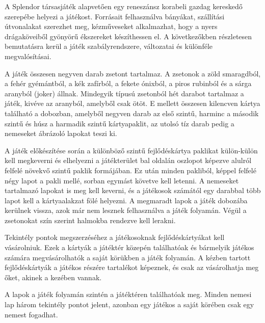 

A Splendor társasjáték alapvetően egy reneszánsz korabeli gazdag kereskedő szerepébe helyezi a játékost.
Forrásait felhasználva bányákat, szállítási útvonalakat szerezhet meg, kézműveseket
alkalmazhat, hogy a nyers drágaköveiből gyönyörű ékszereket készíthessen el.
A következőkben részletesen bemutatásra kerül a játék szabályrendszere, változatai és különféle megvalósításai.


A játék összesen negyven darab zsetont tartalmaz. A zsetonok a zöld smaragdból, a fehér gyémántból, a kék zafírból, a fekete ónixból, a piros rubinból és a sárga aranyból (joker) állnak. Mindegyik típusú zsetonból hét darabot tartalmaz a játék, kivéve az aranyból, amelyből csak ötöt. E mellett összesen kilencven kártya található a dobozban, amelyből negyven darab az első szintű, harminc a második szintű és húsz a harmadik szintű kártyapaklit, az utolsó tíz darab pedig a nemeseket ábrázoló lapokat teszi ki.

A játék előkészítése során a különböző szintű fejlődéskártya paklikat külön-külön kell megkeverni és elhelyezni a játékterület bal oldalán oszlopot képezve alulról felfelé növekvő szintű paklik formájában.
Ez után minden pakliból, képpel felfelé négy lapot a pakli mellé, sorban
egymást követve kell letenni.
A nemeseket tartalmazó lapokat is meg kell keverni, és a játékosok számától egy darabbal több lapot kell a kártyaalakzat fölé helyezni. A megmaradt lapok a játék dobozába kerülnek vissza, azok már nem lesznek
felhasználva a játék folyamán. Végül a zsetonokat szín szerint halmokba rendezve kell lerakni.


Tekintély pontok megszerzéséhez a játékosoknak fejlődéskártyákat kell vásárolniuk. Ezek a kártyák a játéktér közepén találhatóak és bármelyik játékos számára megvásárolhatók a saját körükben a játék folyamán. A kézben tartott fejlődéskártyák a játékos részére tartalékot képeznek, és csak az vásárolhatja meg őket, akinek a kezében vannak.


A lapok a játék folyamán szintén a játéktéren találhatóak meg. Minden nemesi lap három tekintély pontot jelent, azonban egy játékos a saját körében csak egy nemest fogadhat.


